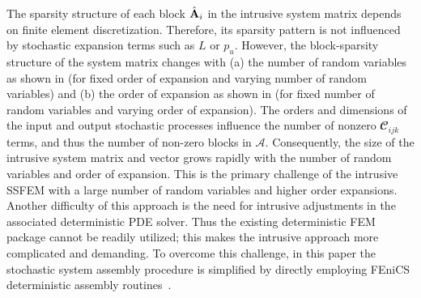 \documentclass[letter,1p,11pt,oneside,onecolumn,sort&compress]{elsarticle}
\begin{document}
The sparsity structure of each block ${\hat{{\mathrm{\bf{A}}}}_i}$ in the intrusive system matrix depends on finite element discretization. Therefore, its sparsity pattern is not influenced by stochastic expansion terms such as $L$ or $p_u$. However, the block-sparsity structure of the system matrix changes with (a) the number of random variables as shown in  (for fixed order of expansion and varying number of random variables) and (b) the order of expansion as shown in  (for fixed number of random variables and varying order of expansion). The orders and dimensions of the input and output stochastic processes influence the number of nonzero $\mathbfcal{C}_{ijk}$ terms, and thus the number of non-zero blocks in  $\mathcal{A}$. Consequently, the size of the intrusive system matrix and vector grows rapidly with the number of random variables and order of expansion.
This is the primary challenge of the intrusive SSFEM with a large number of random variables and higher order expansions.
Another difficulty of this approach is the need for intrusive adjustments in the associated deterministic PDE solver. Thus the existing deterministic FEM package cannot be readily utilized; this makes the intrusive approach more complicated and demanding.
To overcome this challenge, in this paper the stochastic system assembly procedure is simplified by directly employing FEniCS deterministic assembly routines~\cite{logg2012FEniCS}.
\end{document}
